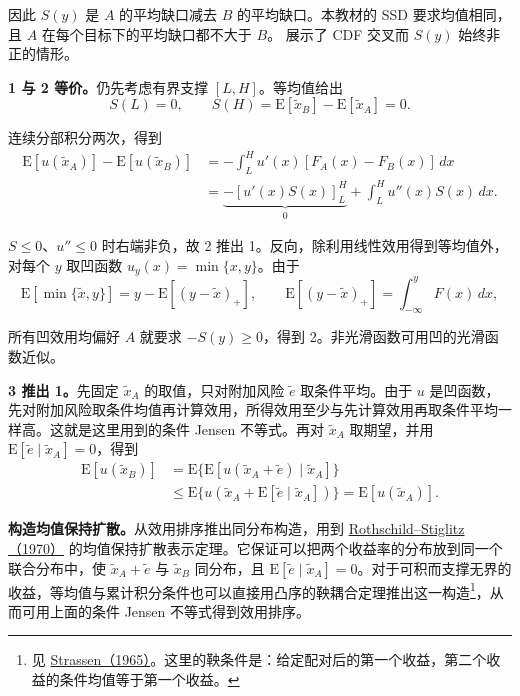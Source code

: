 因此 $S(y)$ 是 $A$ 的平均缺口减去 $B$ 的平均缺口。本教材的 SSD 要求均值相同，且 $A$ 在每个目标下的平均缺口都不大于 $B$。 展示了 CDF 交叉而 $S(y)$ 始终非正的情形。


\begin{solution}[label-content={证明},blank-type=none]
\textbf{1 与 2 等价。}仍先考虑有界支撑 $[L,H]$。等均值给出
\[
 S(L)=0,\qquad S(H)=\mathrm E[\tilde x_B]-\mathrm E[\tilde x_A]=0.
\]

连续分部积分两次，得到
\[
\begin{aligned}
 \mathrm E[u(\tilde x_A)]-\mathrm E[u(\tilde x_B)]
 &=-\int_L^H u'(x)[F_A(x)-F_B(x)]\,dx\\
 &=\underbrace{-[u'(x)S(x)]_L^H}_{0}+\int_L^H u''(x)S(x)\,dx.
\end{aligned}
\]

$S\le0$、$u''\le0$ 时右端非负，故 2 推出 1。反向，除利用线性效用得到等均值外，对每个 $y$ 取凹函数 $u_y(x)=\min\{x,y\}$。由于
\[
 \mathrm E[\min\{\tilde x,y\}]
 =y-\mathrm E[(y-\tilde x)_+],\qquad
 \mathrm E[(y-\tilde x)_+]=\int_{-\infty}^y F(x)\,dx,
\]

所有凹效用均偏好 $A$ 就要求 $-S(y)\ge0$，得到 2。非光滑函数可用凹的光滑函数近似。

\textbf{3 推出 1。}先固定 $\tilde x_A$ 的取值，只对附加风险 $\tilde e$ 取条件平均。由于 $u$ 是凹函数，先对附加风险取条件均值再计算效用，所得效用至少与先计算效用再取条件平均一样高。这就是这里用到的条件 Jensen 不等式。再对 $\tilde x_A$ 取期望，并用 $\mathrm E[\tilde e\mid\tilde x_A]=0$，得到
\[
\begin{aligned}
 \mathrm E[u(\tilde x_B)]
 &=\mathrm E\{\mathrm E[u(\tilde x_A+\tilde e)\mid\tilde x_A]\}\\
 &\le\mathrm E\{u(\tilde x_A+\mathrm E[\tilde e\mid\tilde x_A])\}
 =\mathrm E[u(\tilde x_A)].
\end{aligned}
\]

\textbf{构造均值保持扩散。}从效用排序推出同分布构造，用到 \href{https://doi.org/10.1016/0022-0531(70)90038-4}{Rothschild--Stiglitz（1970）} 的均值保持扩散表示定理。它保证可以把两个收益率的分布放到同一个联合分布中，使 $\tilde x_A+\tilde e$ 与 $\tilde x_B$ 同分布，且 $\mathrm E[\tilde e\mid\tilde x_A]=0$。对于可积而支撑无界的收益，等均值与累计积分条件也可以直接用凸序的鞅耦合定理推出这一构造\footnote{见 \href{https://doi.org/10.1214/aoms/1177700153}{Strassen（1965）}。这里的鞅条件是：给定配对后的第一个收益，第二个收益的条件均值等于第一个收益。}，从而可用上面的条件 Jensen 不等式得到效用排序。
\end{solution}

